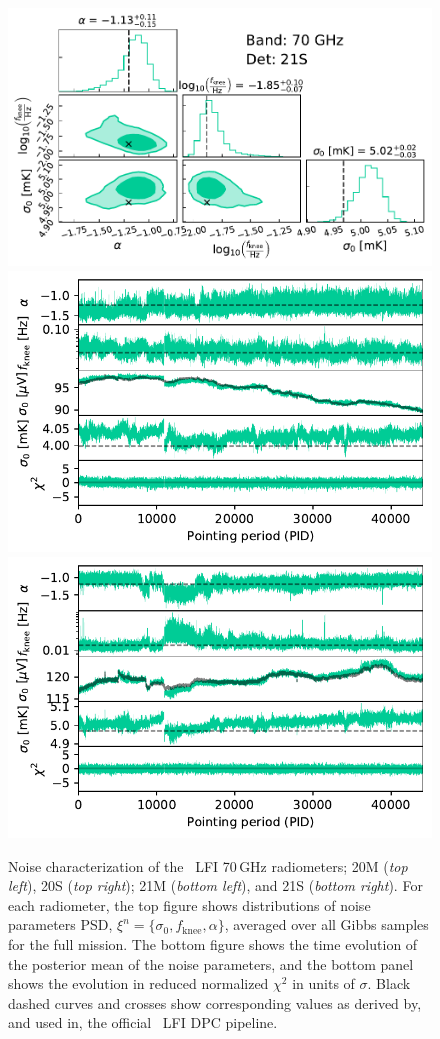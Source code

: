 \documentclass{aa}
\begin{document}
\begin{figure}[p]
\begin{center}
                \includegraphics[width=0.495\linewidth]{figs/corner_band_070_det_8_mean_new.pdf}\\
                \includegraphics[width=0.495\linewidth]{figs/xi_vs_pid_band_070_det_7_mean_new.pdf}
                \includegraphics[width=0.495\linewidth]{figs/xi_vs_pid_band_070_det_8_mean_new.pdf}
                 \vspace*{-5.5mm}            
        \end{center}
        
        \caption{Noise characterization of the \Planck\ LFI 70\,GHz
                radiometers; 20M (\emph{top left}), 20S (\emph{top right}); 21M
                (\emph{bottom left}), and 21S (\emph{bottom right}). For each
                radiometer, the top figure shows distributions of noise parameters
                PSD, $\xi^n = \{\sigma_0, f_\mathrm{knee}, \alpha\}$, averaged
                over all Gibbs samples for the full mission. The bottom figure
                shows the time evolution of the posterior mean of the noise
                parameters, and the bottom panel shows the evolution in reduced
                normalized $\chi^2$ in units of $\sigma$. Black dashed curves and crosses show corresponding values as derived by, and used in, the
                official \Planck\ LFI DPC pipeline.
                \label{fig:xi_prop_70_2}}
\end{figure}
\end{document}
